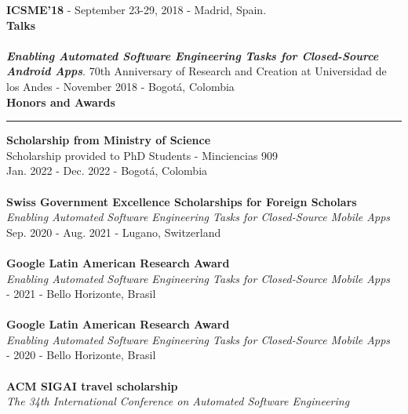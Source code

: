 \documentclass[letterpaper,11pt,oneside]{article}
\begin{document}
\indent \textbf{ICSME'18} - September 23-29, 2018 - Madrid, Spain. \\
\noindent \large{\textbf{Talks}} \\
\\
\indent \textit{\textbf{Enabling Automated Software Engineering Tasks for Closed-Source Android Apps}}. 70th Anniversary of Research and Creation at Universidad de los Andes - November 2018 - Bogot\'a, Colombia
\\ \newpage
\noindent \Large{\textbf{Honors and Awards}} \\
\vspace{-2ex}
\hrule 
\normalsize
\vspace{2ex}
\noindent \indent \textbf{Scholarship from Ministry of Science } \\
\indent Scholarship provided to PhD Students - Minciencias 909\\
\indent Jan. 2022 - Dec. 2022 - Bogot\'a, Colombia \\
\\
\noindent \indent \textbf{Swiss Government Excellence Scholarships for Foreign Scholars} \\
\indent \textit{Enabling Automated Software Engineering Tasks for Closed-Source Mobile Apps}\\
\indent Sep. 2020 - Aug. 2021 - Lugano, Switzerland \\
\\
\noindent \indent \textbf{Google Latin American Research Award} \\
\indent \textit{Enabling Automated Software Engineering Tasks for Closed-Source Mobile Apps}\\
 - 2021 - Bello Horizonte, Brasil \\
\\
\noindent \indent \textbf{Google Latin American Research Award} \\
\indent \textit{Enabling Automated Software Engineering Tasks for Closed-Source Mobile Apps}\\
 - 2020 - Bello Horizonte, Brasil \\
\\
\noindent \indent \textbf{ACM SIGAI travel scholarship} \\
\indent \textit{The 34th International Conference on Automated Software Engineering }\\
\end{document}
